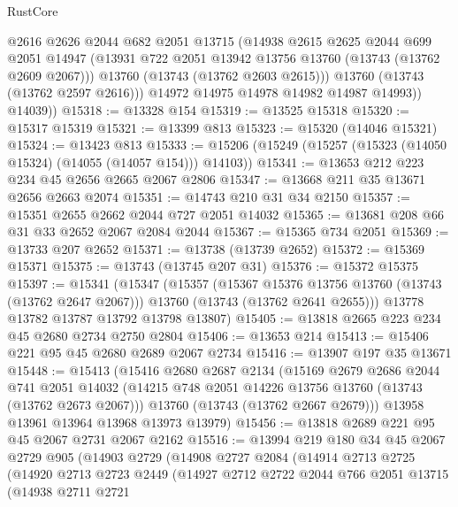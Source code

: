 \begin{lexlean}{RustCore}
\begin{coremodule}
              @2616
              @2626
              @2044
              @682
              @2051
              @13715
              (@14938
                @2615
                @2625
                @2044
                @699
                @2051
                @14947
                (@13931 @722 @2051 @13942 @13756 @13760 (@13743 (@13762 @2609 @2067)))
                @13760
                (@13743 (@13762 @2603 @2615)))
              @13760
              (@13743 (@13762 @2597 @2616)))
            @14972
            @14975
            @14978
            @14982
            @14987
            @14993))
        @14039))
@15318 := @13328 @154
@15319 := @13525 @15318
@15320 := @15317 @15319
@15321 := @13399 @813
@15323 := @15320 (@14046 @15321)
@15324 := @13423 @813
@15333 := @15206 (@15249 (@15257 (@15323 (@14050 @15324) (@14055 (@14057 @154))) @14103))
@15341 := @13653 @212 @223 @234 @45 @2656 @2665 @2067 @2806
@15347 := @13668 @211 @35 @13671 @2656 @2663 @2074
@15351 := @14743 @210 @31 @34 @2150
@15357 := @15351 @2655 @2662 @2044 @727 @2051 @14032
@15365 := @13681 @208 @66 @31 @33 @2652 @2067 @2084 @2044
@15367 := @15365 @734 @2051
@15369 := @13733 @207 @2652
@15371 := @13738 (@13739 @2652)
@15372 := @15369 @15371
@15375 := @13743 (@13745 @207 @31)
@15376 := @15372 @15375
@15397 := @15341
    (@15347
      (@15357
        (@15367 @15376 @13756 @13760 (@13743 (@13762 @2647 @2067)))
        @13760
        (@13743 (@13762 @2641 @2655)))
      @13778
      @13782
      @13787
      @13792
      @13798
      @13807)
@15405 := @13818 @2665 @223 @234 @45 @2680 @2734 @2750 @2804
@15406 := @13653 @214
@15413 := @15406 @221 @95 @45 @2680 @2689 @2067 @2734
@15416 := @13907 @197 @35 @13671
@15448 := @15413
    (@15416
      @2680
      @2687
      @2134
      (@15169
        @2679
        @2686
        @2044
        @741
        @2051
        @14032
        (@14215 @748 @2051 @14226 @13756 @13760 (@13743 (@13762 @2673 @2067)))
        @13760
        (@13743 (@13762 @2667 @2679)))
      @13958
      @13961
      @13964
      @13968
      @13973
      @13979)
@15456 := @13818 @2689 @221 @95 @45 @2067 @2731 @2067 @2162
@15516 := @13994
    @219
    @180
    @34
    @45
    @2067
    @2729
    @905
    (@14903
      @2729
      (@14908
        @2727
        @2084
        (@14914
          @2713
          @2725
          (@14920
            @2713
            @2723
            @2449
            (@14927
              @2712
              @2722
              @2044
              @766
              @2051
              @13715
              (@14938
                @2711
                @2721

\end{coremodule}
\end{lexlean}
